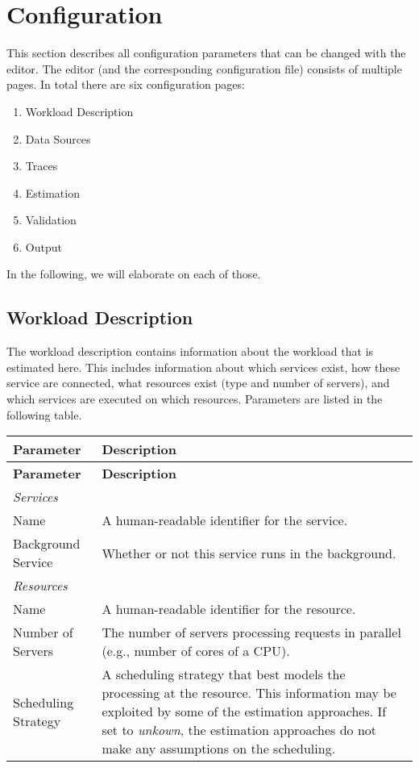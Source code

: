 \section{Configuration}
This section describes all configuration parameters that can be changed with
the editor. 
The editor (and the corresponding configuration file) consists of multiple pages. 
In total there are six  configuration pages: 
\begin{enumerate}
    \item Workload Description
    \item Data Sources
    \item Traces
    \item Estimation
    \item Validation
    \item Output
\end{enumerate}

In the following, we will elaborate on each of those.

\subsection{Workload Description}
The workload description contains information about the workload that is estimated here.
This includes information about which services exist, how these service are connected, what resources exist (type and number of servers), and which services are executed on which resources.
Parameters are listed in the following table.


     \begin{tabularx}{\textwidth}{lX}
   \toprule
   \textbf{Parameter} & \textbf{Description} \\
   \midrule
   \endfirsthead %
   \toprule
   \textbf{Parameter} & \textbf{Description} \\
   \midrule
   \endhead %
   \bottomrule
   \endfoot
    \textit{Services} \\
    Name & A human-readable identifier for the service. \\
    Background Service & Whether or not this service runs in the background. \\
    \midrule 
    \textit{Resources} \\
    Name & A human-readable identifier for the resource. \\
    Number of Servers & The number of servers processing requests in parallel
    (e.g., number of cores of a CPU). \\
    Scheduling Strategy & A scheduling strategy that best models the processing
    at the resource. This information may be
    exploited by some of the estimation approaches. If
    set to \textit{unkown}, the estimation approaches do not
    make any assumptions on the scheduling. \\
    \end{tabularx}

